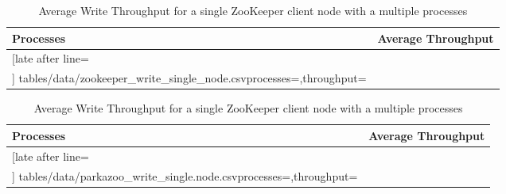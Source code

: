 \begin{table}[ht!]
	\centering
	\begin{subtable}{0.45\linewidth}
		\begin{tabular}{|l|c|}\hline%
			\textbf{Processes}   & \textbf{Average Throughput} \\\hline
			\csvreader[late after line=\\\hline]%
			{tables/data/zookeeper_write_single_node.csv}{processes=\processes,throughput=\throughput}%
			{\processes & \throughput}%
		\end{tabular}
		\caption{ZooKeeper}
		\label{table:single_node_zookeeper_throughput}
	\end{subtable}
	\quad
	\begin{subtable}{0.45\linewidth}
		\begin{tabular}{|l|c|}\hline%
			\textbf{Processes}   & \textbf{Average Throughput} \\\hline
			\csvreader[late after line=\\\hline]%
			{tables/data/parkazoo_write_single.node.csv}{processes=\processes,throughput=\throughput}%
			{\processes & \throughput}%
		\end{tabular}
		\caption{ParKazoo}
		\label{table:single_node_parkazoo_throughput}
	\end{subtable}
	  
	\caption{Average Write Throughput for a single ZooKeeper client node with a multiple processes}
	\label{table:single_node_write_throughput}
\end{table}
